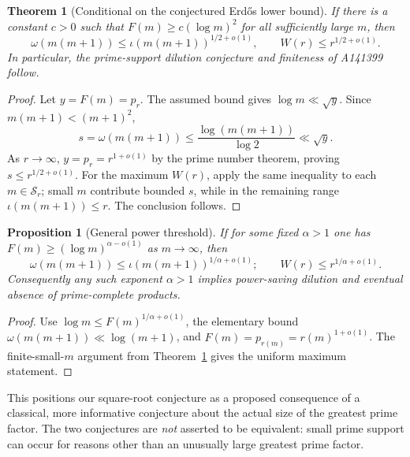 \documentclass[11pt,letterpaper]{article}
\newtheorem{theorem}[conjecture]{Theorem}
\newtheorem{proposition}[conjecture]{Proposition}
\theoremstyle{remark}
\begin{document}
\begin{theorem}[Conditional on the conjectured Erd\H{o}s lower bound]
\label{thm:erdos}
If there is a constant $c>0$ such that
$F(m)\ge c(\log m)^2$ for all sufficiently large $m$, then
\[
\omega(m(m+1))\le\iota(m(m+1))^{1/2+o(1)},
\qquad W(r)\le r^{1/2+o(1)}.
\]
In particular, the prime-support dilution conjecture and finiteness
of A141399 follow.
\end{theorem}
\begin{proof}
Let $y=F(m)=p_r$. The assumed bound gives
$\log m\ll\sqrt y$. Since $m(m+1)<(m+1)^2$,
\[
 s=\omega(m(m+1))\le\frac{\log(m(m+1))}{\log 2}
 \ll\sqrt y.
\]
As $r\to\infty$, $y=p_r=r^{1+o(1)}$ by the prime number
theorem, proving $s\le r^{1/2+o(1)}$. For the maximum $W(r)$,
apply the same inequality to each $m\in\mathcal S_r$;
small $m$ contribute bounded $s$, while in the remaining range
$\iota(m(m+1))\le r$. The conclusion follows.
\end{proof}

\begin{proposition}[General power threshold]\label{prop:powthresh}
If for some fixed $\alpha>1$ one has
$F(m)\ge(\log m)^{\alpha-o(1)}$ as $m\to\infty$, then
\[
 \omega(m(m+1))\le\iota(m(m+1))^{1/\alpha+o(1)};
 \qquad W(r)\le r^{1/\alpha+o(1)}.
\]
Consequently any such exponent $\alpha>1$ implies power-saving
dilution and eventual absence of prime-complete products.
\end{proposition}
\begin{proof}
Use $\log m\le F(m)^{1/\alpha+o(1)}$, the elementary
bound $\omega(m(m+1))\ll\log(m+1)$, and
$F(m)=p_{r(m)}=r(m)^{1+o(1)}$. The finite-small-$m$ argument
from Theorem~\ref{thm:erdos} gives the uniform maximum statement.
\end{proof}

This positions our square-root conjecture as a proposed consequence
of a classical, more informative conjecture about the actual size of
the greatest prime factor. The two conjectures are \emph{not} asserted
to be equivalent: small prime support can occur for reasons other
than an unusually large greatest prime factor.
\end{document}
